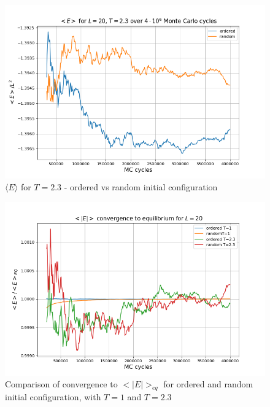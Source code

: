 \documentclass[%
oneside,                 %
final,                   %
10pt]{article}
\begin{document}
\begin{figure}[!htb]
        \centering 
         \includegraphics[scale=.55]{../Results/L20T23_E.png} 
        \caption{$\langle E \rangle$ for $T=2.3$ - ordered vs random initial configuration}
        \label{fig:L20T23E}   
\end{figure} 

\begin{figure}[!htb]
        \centering 
         \includegraphics[scale=.55]{../Results/Econvergence.png} 
        \caption{Comparison of convergence to $<|E|>_{eq}$ for ordered and random initial configuration, with $T=1$ and $T=2.3$}
        \label{fig:SPIN.E.convergence}   
\end{figure} 
\end{document}
